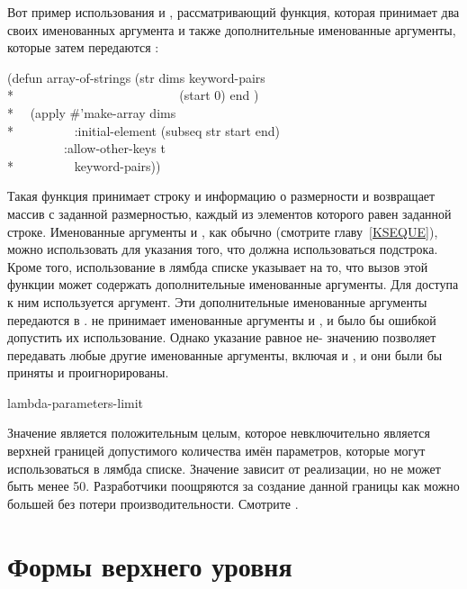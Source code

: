 Вот пример использования  и , 
рассматривающий функция, которая принимает два своих именованных аргумента и
также дополнительные именованные аргументы, которые затем передаются
:
\begin{lisp}
(defun array-of-strings (str dims  keyword-pairs \\*
~~~~~~~~~~~~~~~~~~~~~~~~~ (start 0) end ) \\*
~~(apply \#'make-array dims \\*
~~~~~~~~~:initial-element (subseq str start end) \\
~~~~~~~~~:allow-other-keys t \\*
~~~~~~~~~keyword-pairs))
\end{lisp}

Такая функция принимает строку и информацию о размерности и возвращает массив с
заданной размерностью, каждый из элементов которого равен заданной
строке. Именованные аргументы  и , как обычно (смотрите
главу~\ref{KSEQUE}), можно использовать для указания того, что должна
использоваться подстрока. Кроме того, использование  в
лямбда списке указывает на то, что вызов этой функции может содержать
дополнительные именованные аргументы. Для доступа к ним используется 
аргумент. Эти дополнительные именованные аргументы передаются в
.  не принимает именованные аргументы
 и , и было бы ошибкой допустить их использование. Однако
указание  равное не-{\false} значению позволяет передавать
любые другие именованные аргументы, включая  и , и они были
бы приняты и проигнорированы.

\begin{defun}[Constant]
lambda-parameters-limit

Значение  является положительным целым, которое
невключительно является верхней границей допустимого количества имён параметров,
которые могут использоваться в лямбда списке.
Значение зависит от реализации, но не может быть менее 50.
Разработчики поощряются за создание данной границы как можно большей без потери
производительности. 
Смотрите .
\end{defun}

\section{Формы верхнего уровня}

